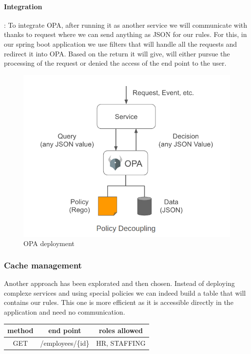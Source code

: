 \paragraph{Integration}: To integrate OPA, after running it as another service we will communicate with thanks to request where we can send anything as JSON for our rules. For this, in our spring boot application we use filters that will handle all the requests and redirect it into OPA. Based on the return it will give, will either pursue the processing of the request or denied the access of the end point to the user. 


\begin{figure}[H]
	\includegraphics[width=150mm]{Image/OPA}
	\caption{OPA deployment}
	\label{fig:OPA deployment}
\end{figure}


\subsubsection{Cache management}

Another approach has been explorated and then chosen. Instead of deploying complexe services and using special policies we can indeed build a table that will contains our rules. This one is more efficient as it is accessible directly in the application and need no communication.

\begin{center}
	\begin{tabular}{| c | c | c |}
		\hline
		method & end point & roles allowed\\ \hline
		GET & /employees/\{id\} & HR, STAFFING\\
		\hline
	\end{tabular}
\end{center}

